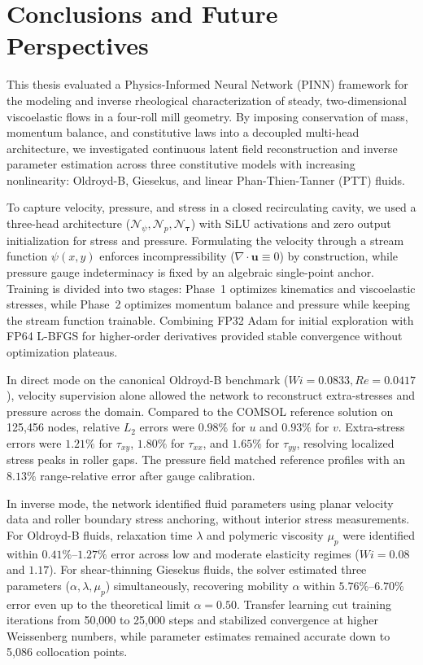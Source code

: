 \chapter{Conclusions and Future Perspectives}
\label{chap:conclusions}

This thesis evaluated a Physics-Informed Neural Network (PINN) framework for the
modeling and inverse rheological characterization of steady, two-dimensional
viscoelastic flows in a four-roll mill geometry. By imposing conservation of mass,
momentum balance, and constitutive laws into a decoupled multi-head
architecture, we investigated continuous latent field reconstruction and inverse
parameter estimation across three constitutive models with increasing
nonlinearity: Oldroyd-B, Giesekus, and linear Phan-Thien-Tanner (PTT) fluids.

To capture velocity, pressure, and stress in a closed recirculating cavity, we
used a three-head architecture ($\mathcal{N}_\psi, \mathcal{N}_p,
\mathcal{N}_{\boldsymbol{\tau}}$) with $\mathrm{SiLU}$ activations and zero output
initialization for stress and pressure. Formulating the velocity through a stream
function $\psi(x, y)$ enforces incompressibility ($\nabla \cdot \boldsymbol{u}
\equiv 0$) by construction, while pressure gauge indeterminacy is fixed by an
algebraic single-point anchor. Training is divided into two stages: Phase~1 optimizes
kinematics and viscoelastic stresses, while Phase~2 optimizes momentum balance
and pressure while keeping the stream function trainable. Combining FP32 Adam
for initial exploration with FP64 L-BFGS for higher-order derivatives provided
stable convergence without optimization plateaus.

In direct mode on the canonical Oldroyd-B benchmark ($Wi = 0.0833, Re = 0.0417$),
velocity supervision alone allowed the network to reconstruct extra-stresses and
pressure across the domain. Compared to the COMSOL reference solution on 125,456
nodes, relative $L_2$ errors were $0.98\%$ for $u$ and $0.93\%$ for $v$. Extra-stress
errors were $1.21\%$ for $\tau_{xy}$, $1.80\%$ for $\tau_{xx}$, and $1.65\%$ for
$\tau_{yy}$, resolving localized stress peaks in roller gaps. The pressure field
matched reference profiles with an $8.13\%$ range-relative error after gauge
calibration.

In inverse mode, the network identified fluid parameters using planar velocity
data and roller boundary stress anchoring, without interior stress measurements.
For Oldroyd-B fluids, relaxation time $\lambda$ and polymeric viscosity $\mu_p$
were identified within $0.41\%\text{--}1.27\%$ error across low and moderate
elasticity regimes ($Wi = 0.08$ and $1.17$). For shear-thinning Giesekus fluids,
the solver estimated three parameters ($\alpha, \lambda, \mu_p$) simultaneously,
recovering mobility $\alpha$ within $5.76\%\text{--}6.70\%$ error even up to the
theoretical limit $\alpha = 0.50$. Transfer learning cut training iterations from
50,000 to 25,000 steps and stabilized convergence at higher Weissenberg numbers,
while parameter estimates remained accurate down to 5,086 collocation points.

